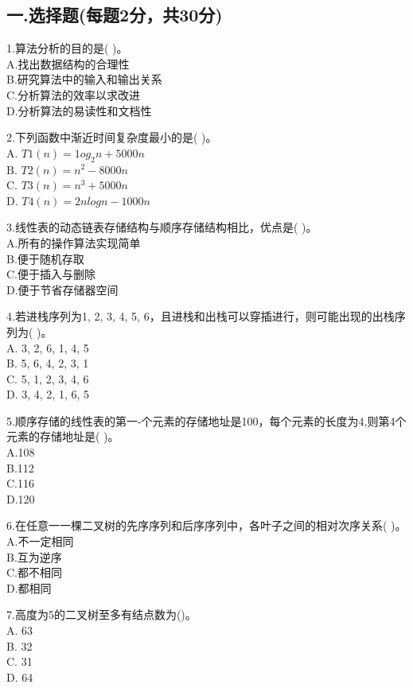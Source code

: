 
\subsection{一.选择题(每题2分，共30分)}
1.算法分析的目的是( )。 \\
A.找出数据结构的合理性 \\
B.研究算法中的输入和输出关系 \\
C.分析算法的效率以求改进 \\
D.分析算法的易读性和文档性

2.下列函数中渐近时间复杂度最小的是( )。 \\
A. $T1(n)=1og_2n+5000n$ \\
B. $T2(n)=n^2-8000n$ \\
C. $T3(n)=n^3+5000n$ \\
D. $T4(n)=2nlogn-1000n$

3.线性表的动态链表存储结构与顺序存储结构相比，优点是( )。 \\
A.所有的操作算法实现简单 \\
B.便于随机存取 \\
C.便于插入与删除 \\
D.便于节省存储器空间

4.若进栈序列为1, 2, 3, 4, 5, 6，且进栈和出栈可以穿插进行，则可能出现的出栈序列为( )。 \\
A. 3, 2, 6, 1, 4, 5 \\
B. 5, 6, 4, 2, 3, 1 \\
C. 5, 1, 2, 3, 4, 6 \\
D. 3, 4, 2, 1, 6, 5

5.顺序存储的线性表的第一-个元素的存储地址是100，每个元素的长度为4,则第4个元素的存储地址是( )。 \\
A.108 \\
B.112 \\
C.116 \\
D.120

6.在任意一一棵二叉树的先序序列和后序序列中，各叶子之间的相对次序关系( )。 \\
A.不一定相同 \\
B.互为逆序 \\
C.都不相同 \\
D.都相同

7.高度为5的二叉树至多有结点数为()。 \\
A. 63 \\
B. 32 \\
C. 31 \\
D. 64

